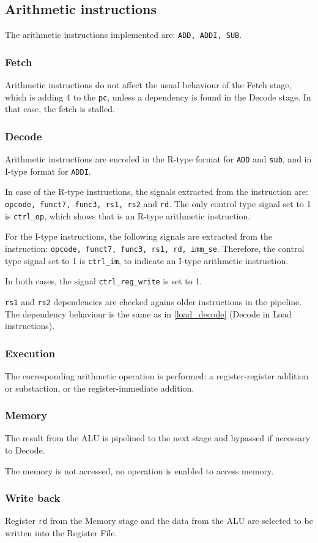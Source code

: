 \subsection{Arithmetic instructions}
The arithmetic instructions implemented are: \texttt{ADD, ADDI, SUB}.

\subsubsection{Fetch}
Arithmetic instructions do not affect the usual behaviour of the Fetch stage, which is adding 4 to the \texttt{pc}, unless a dependency is found in the Decode stage.
In that case, the fetch is stalled.

\subsubsection{Decode}
Arithmetic instructions are encoded in the R-type format for \texttt{ADD} and \texttt{sub}, and in I-type format for \texttt{ADDI}.

In case of the R-type instructions, the signals extracted from the instruction are: \texttt{opcode, funct7, func3, rs1, rs2} and \texttt{rd}.
The only control type signal set to 1 is \texttt{ctrl\_op}, which shows that is an R-type arithmetic instruction.

For the I-type instructions, the following signals are extracted from the instruction: \texttt{opcode, funct7, func3, rs1, rd, imm\_se}.
Therefore, the control type signal set to 1 is \texttt{ctrl\_im}, to indicate an I-type arithmetic instruction.

In both cases, the signal \texttt{ctrl\_reg\_write} is set to 1.

\texttt{rs1} and \texttt{rs2} dependencies are checked agains older instructions in the pipeline. 
The dependency behaviour is the same as in \autoref{load_decode} (Decode in Load instructions).

\subsubsection{Execution}
The corresponding arithmetic operation is performed: a register-register addition or substaction, or the register-immediate addition.

\subsubsection{Memory}
The result from the ALU is pipelined to the next stage and bypassed if necessary to Decode.

The memory is not accessed, no operation is enabled to access memory.

\subsubsection{Write back}
Register \texttt{rd} from the Memory stage and the data from the ALU are selected to be written into the Register File.


